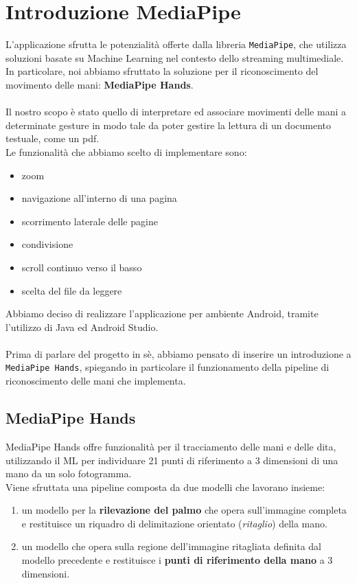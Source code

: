 \chapter{Introduzione MediaPipe}

L'applicazione sfrutta le potenzialità offerte dalla libreria \texttt{MediaPipe}, che utilizza soluzioni basate su Machine Learning nel contesto dello streaming multimediale. 
In particolare, noi abbiamo sfruttato la soluzione per il riconoscimento del movimento delle mani: \textbf{MediaPipe Hands}.\\
\\
\noindent Il nostro scopo è stato quello di interpretare ed associare movimenti delle mani a determinate gesture in modo tale da poter gestire la lettura di un documento testuale, come un pdf.\\Le funzionalità che abbiamo scelto di implementare sono:
\begin{itemize}
    \item zoom
    \item navigazione all'interno di una pagina
    \item scorrimento laterale delle pagine
    \item condivisione
    \item scroll continuo verso il basso
    \item scelta del file da leggere
\end{itemize}
\noindent Abbiamo deciso di realizzare l'applicazione per ambiente Android, tramite l'utilizzo di Java ed Android Studio.\\
\\
\noindent Prima di parlare del progetto in sè, abbiamo pensato di inserire un introduzione a \texttt{MediaPipe Hands}, 
spiegando in particolare il funzionamento della pipeline di riconoscimento delle mani che implementa.

\newpage
\section{MediaPipe Hands}

MediaPipe Hands offre funzionalità per il tracciamento delle mani e delle dita, utilizzando il ML per individuare 21 punti di riferimento a 3 dimensioni di una mano da un solo fotogramma.\\
Viene sfruttata una pipeline composta da due modelli che lavorano insieme:
\begin{enumerate}
    \item un modello per la \textbf{rilevazione del palmo} che opera sull'immagine completa e restituisce un riquadro di delimitazione orientato (\textit{ritaglio}) della mano. 
    \item un modello che opera sulla regione dell'immagine ritagliata definita dal modello precedente e restituisce i \textbf{punti di riferimento della mano} a 3 dimensioni.
\end{enumerate}

